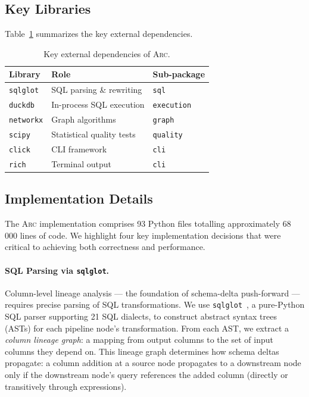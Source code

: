 \documentclass[sigplan,screen,nonacm]{acmart}
\newcommand{\arc}{\textsc{Arc}\xspace}
\begin{document}
\subsection{Key Libraries}

Table~\ref{tab:deps} summarizes the key external dependencies.

\begin{table}[t]
\caption{Key external dependencies of \arc.}
\label{tab:deps}
\centering\small
\begin{tabular}{@{}lll@{}}
\toprule
\textbf{Library} & \textbf{Role} & \textbf{Sub-package} \\
\midrule
\texttt{sqlglot}  & SQL parsing \& rewriting & \texttt{sql} \\
\texttt{duckdb}   & In-process SQL execution & \texttt{execution} \\
\texttt{networkx} & Graph algorithms         & \texttt{graph} \\
\texttt{scipy}    & Statistical quality tests & \texttt{quality} \\
\texttt{click}    & CLI framework            & \texttt{cli} \\
\texttt{rich}     & Terminal output           & \texttt{cli} \\
\bottomrule
\end{tabular}
\end{table}

\subsection{Implementation Details}\label{sec:impl}

The \arc implementation comprises 93 Python files totalling
approximately 68\,000 lines of code.  We highlight four key
implementation decisions that were critical to achieving both
correctness and performance.

\paragraph{SQL Parsing via \texttt{sqlglot}.}
Column-level lineage analysis --- the foundation of schema-delta
push-forward --- requires precise parsing of SQL transformations.
We use \texttt{sqlglot}~\cite{sqlglot2023}, a pure-Python SQL parser
supporting 21 SQL dialects, to construct abstract syntax trees (ASTs)
for each pipeline node's transformation.  From each AST, we extract a
\emph{column lineage graph}: a mapping from output columns to the set
of input columns they depend on.  This lineage graph determines how
schema deltas propagate: a column addition at a source node propagates
to a downstream node only if the downstream node's query references
the added column (directly or transitively through expressions).
\end{document}
